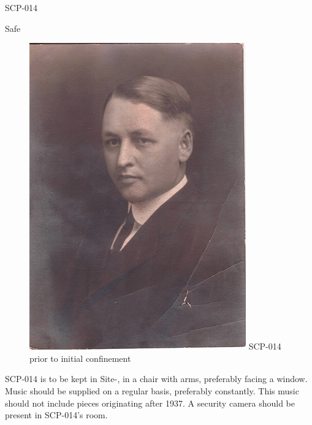 
 SCP-014

 Safe

\begin{figure}[h]
\begin{center}
\includegraphics[scale=4]{scp/014.jpg}
\linebreak SCP-014 prior to initial confinement
\end{center}
\end{figure}

 SCP-014 is to be kept in Site-, in a chair with arms, preferably facing a window. Music should be supplied on a regular basis, preferably constantly. This music should not include pieces originating after 1937. A security camera should be present in SCP-014's room.

